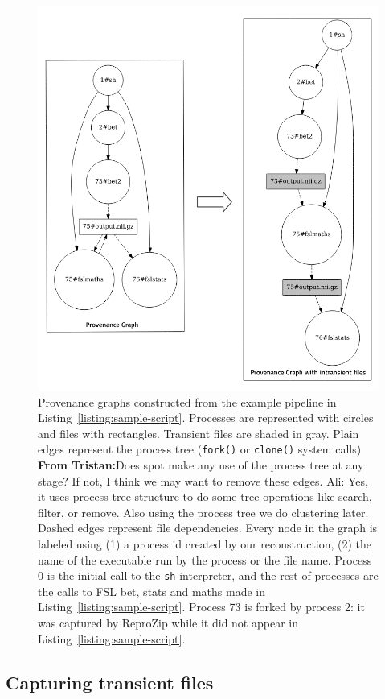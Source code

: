 \documentclass[a4paper,num-refs]{oup-contemporary}
\newcommand{\reprozip}[0]{ReproZip\xspace}
\newcommand{\tristan}[1]{\color{blue}\textbf{From Tristan:}#1\color{black}}
\begin{document}
\begin{figure}
\centering
  \includegraphics[width=.8\columnwidth]{images/provenance-graphs}
  \caption{Provenance graphs
  constructed from the example pipeline in
  Listing~\ref{listing:sample-script}.
  Processes are represented with circles and files with rectangles.
  Transient files are shaded in gray. 
  Plain edges 
  represent the process tree (\texttt{fork()} or \texttt{clone()} 
  system calls) 
  \tristan{Does spot make any use of the process tree at any stage? If not, 
  I think we may want to remove these edges. 
  Ali: Yes, it uses process tree structure to do some tree operations like search, filter, or remove.
  Also using the process tree we do clustering later}. 
  Dashed edges represent file dependencies.
  Every node in the graph is labeled using (1) a process id created by our
  reconstruction, (2) the name of the executable run by the process or the file name.
  Process 0 is the initial call to the \texttt{sh} interpreter, and
  the rest of processes are the calls to FSL bet, stats and maths made in
  Listing~\ref{listing:sample-script}. Process 73 is forked by process 2: 
  it was captured by \reprozip while it did not appear in
  Listing~\ref{listing:sample-script}.  
}
  \label{fig:simple_script}
\end{figure}

\subsection{Capturing transient files}
\end{document}
